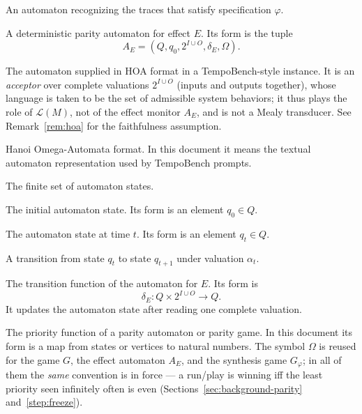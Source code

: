 \documentclass[11pt]{article}
\theoremstyle{remark}
\newcommand{\Lang}{\mathcal{L}}
\begin{document}
\begin{description}[leftmargin=2.8cm,style=nextline]
  \item[\(A_\varphi\)]
  An automaton recognizing the traces that satisfy specification \(\varphi\).

  \item[\(A_E\)]
  A deterministic parity automaton for effect \(E\). Its form is the tuple
  \[
    A_E=(Q,q_0,2^{I\cup O},\delta_E,\Omega).
  \]

  \item[\(A_{\mathrm{HOA}}\)]
  The automaton supplied in HOA format in a TempoBench-style instance. It is an
  \emph{acceptor} over complete valuations \(2^{I\cup O}\) (inputs and outputs
  together), whose language is taken to be the set of admissible system
  behaviors; it thus plays the role of \(\Lang(M)\), not of the effect monitor
  \(A_E\), and is not a Mealy transducer. See Remark~\ref{rem:hoa} for the
  faithfulness assumption.

  \item[HOA]
  Hanoi Omega-Automata format. In this document it means the textual automaton
  representation used by TempoBench prompts.

  \item[\(Q\)]
  The finite set of automaton states.

  \item[\(q_0\)]
  The initial automaton state. Its form is an element \(q_0\in Q\).

  \item[\(q_t\)]
  The automaton state at time \(t\). Its form is an element \(q_t\in Q\).

  \item[\(q_t\xrightarrow{\alpha_t}q_{t+1}\)]
  A transition from state \(q_t\) to state \(q_{t+1}\) under valuation
  \(\alpha_t\).

  \item[\(\delta_E\)]
  The transition function of the automaton for \(E\). Its form is
  \[
    \delta_E:Q\times 2^{I\cup O}\to Q.
  \]
  It updates the automaton state after reading one complete valuation.

  \item[\(\Omega\)]
  The priority function of a parity automaton or parity game. In this document
  its form is a map from states or vertices to natural numbers. The symbol
  \(\Omega\) is reused for the game \(G\), the effect automaton \(A_E\), and the
  synthesis game \(G_\varphi\); in all of them the \emph{same} convention is in
  force --- a run/play is winning iff the least priority seen infinitely often is
  even (Sections~\ref{sec:background-parity} and~\ref{step:freeze}).


\end{description}
\end{document}

